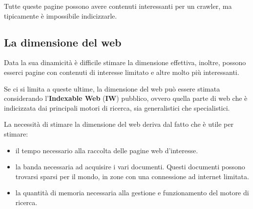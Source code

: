 Tutte queste pagine possono avere contenuti interessanti per un crawler, ma tipicamente è impossibile indicizzarle.

\subsection{La dimensione del web}

Data la sua dinamicità è difficile stimare la dimensione effettiva, inoltre, possono esserci pagine con contenuti di interesse limitato e altre molto più interessanti.

Se ci si limita a queste ultime, la dimensione del web può essere stimata considerando l'\textbf{Indexable Web} (\textbf{IW}) pubblico, ovvero quella parte di web che è indicizzata dai principali motori di ricerca, sia generalistici che specialistici.

La necessità di stimare la dimensione del web deriva dal fatto che è utile per stimare:

\begin{itemize}
	\item il tempo necessario alla raccolta delle pagine web d'interesse.
	\item la banda necessaria ad acquisire i vari documenti. Questi documenti possono trovarsi sparsi per il mondo, in zone con una connessione ad internet limitata.
	\item la quantità di memoria necessaria alla gestione e funzionamento del motore di ricerca.
\end{itemize}






















